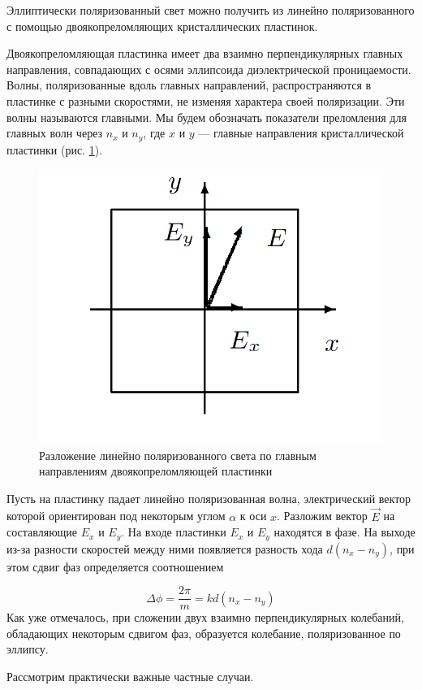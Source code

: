 \documentclass[a4paper,12pt]{article}
\begin{document}
Эллиптически поляризованный свет можно получить из линейно поляризованного с
помощью двоякопреломляющих кристаллических пластинок.

Двоякопреломляющая пластинка имеет два взаимно перпендикулярных главных направления, совпадающих с осями эллипсоида диэлектрической проницаемости. Волны, поляризованные вдоль главных направлений, распространяются в пластинке с разными скоростями, не изменяя характера своей поляризации. Эти волны называются главными. Мы будем обозначать показатели преломления для главных волн через $ n_x $ и $ n_y $, где $ x $ и $ y $ --- главные направления кристаллической пластинки (рис. \ref{ris 1}).

\begin{figure}[h] 
	\centering
	\includegraphics[width=0.3\linewidth]{1}
	\caption{Разложение линейно поляризованного света по главным направлениям двоякопреломляющей пластинки}
	\label{ris 1}
\end{figure}

Пусть на пластинку падает линейно поляризованная волна, электрический вектор которой ориентирован под некоторым углом $ \alpha $ к оси
$ x $. Разложим вектор $ \vec{E} $ на составляющие $ E_x $ и $ E_y $. На входе пластинки $ E_x $ и $ E_y $ находятся в фазе. На выходе из-за разности скоростей между ними появляется разность хода $ d(n_x - n_y) $, при этом сдвиг фаз определяется соотношением

\begin{equation}\label{}
	\Delta \phi =  \dfrac{2\pi}{m} = k d(n_x - n_y)
\end{equation}
Как уже отмечалось, при сложении двух взаимно перпендикулярных колебаний, обладающих некоторым сдвигом фаз, образуется колебание, поляризованное по эллипсу.

Рассмотрим практически важные частные случаи.
\end{document}
